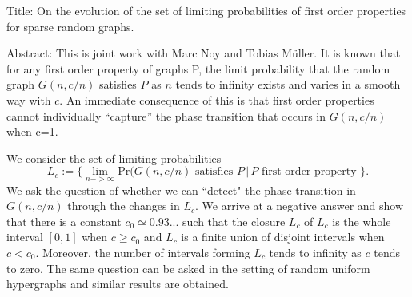 \documentclass{article}
\begin{document}
	
Title: On the evolution of the set of limiting probabilities of first order properties for sparse random graphs. \par

Abstract: This is joint work with Marc Noy and Tobias M\"uller. It is known that for any first order property of graphs P,
the limit probability that the random graph $G(n,c/n)$ satisfies $P$ as $n$ tends to infinity exists and varies in a smooth 
way with $c$. An immediate consequence of this is that first order properties cannot individually ``capture'' the phase
transition that occurs in $G(n,c/n)$ when c=1. \par
We consider the set of limiting probabilities
\[L_c:= \{ \lim\limits_{n->\infty} \mathrm{Pr}(G(n,c/n) \text{ satisfies } P \, |
\, P \text{ first order property } \}.\]
We ask the question of whether we can ``detect" the phase transition in $G(n,c/n)$ through the changes in $L_c$. We 
arrive at a negative answer and show that there is a constant $c_0\simeq 0.93...$ such that the closure $\overline{L_c}$ 
of $L_c$ is the whole interval $[0,1]$ when $c\geq c_0$ and $\overline{L_c}$ is a finite union of disjoint intervals when 
$c< c_0$. Moreover, the number of intervals forming  $\overline{L_c}$ tends to infinity as $c$ tends to zero. The same
question can be asked in the setting of random uniform hypergraphs and similar results are obtained. 
\end{document}
